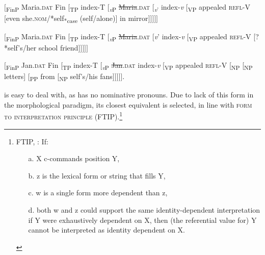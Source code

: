 \documentclass[output=paper,nonflat,colorlinks,citecolor=brown,newtxmath]{langsci/langscibook}
\begin{document}
\ea \label{ex:witkos:50}
$[$\textsubscript{FinP} Maria.\textsc{dat} Fin [\textsubscript{TP} index-T [\textsubscript{\textit{v}P} \sout{Maria}.\textsc{dat} [\textsubscript{\textit{v}’} index-\textit{v} [\textsubscript{VP} appealed \textsc{refl}-V [even she.\textsc{nom}/*self\textsubscript{*case} (self/alone)] in mirror$]]]]]$\\
\z

\ea \label{ex:witkos:51}
$[$\textsubscript{FinP} Maria.\textsc{dat} Fin [\textsubscript{TP} index-T [\textsubscript{\textit{v}P} \sout{Maria}.\textsc{dat} [\textit{v}’ index-\textit{v} [\textsubscript{VP} appealed \textsc{refl}-V [?*self’s/her school friend$]]]]]$\\
\z

\ea \label{ex:witkos:52}
$[$\textsubscript{FinP} Jan.\textsc{dat} Fin [\textsubscript{TP} index-T [\textsubscript{\textit{v}P} \sout{Jan}.\textsc{dat} index-\textit{v} [\textsubscript{VP} appealed \textsc{refl}-V [\textsubscript{NP} [\textsubscript{NP} letters] [\textsubscript{PP} from [\textsubscript{NP} self’s/his fans$]]]]]$.\\
\z

\largerpage[-1]
\noindent {} is easy to deal with, as  has no nominative  pronouns. Due to lack of this form in the morphological paradigm, its closest equivalent is selected, in line with  \textsc{form to interpretation principle} (FTIP).\footnote{\label{fn27}FTIP, \cite{safir2004}: If:
\begin{itemize}
    \item[a.] X c-commands position Y,
    \item[b.] z is the lexical form or string that fills Y,
    \item[c.] w is a single form more dependent than z,
    \item[d.] both w and z could support the same identity-dependent interpretation if Y were exhaustively dependent on X, then (the referential value for) Y cannot be interpreted as identity dependent on X.\end{itemize}}
\end{document}
